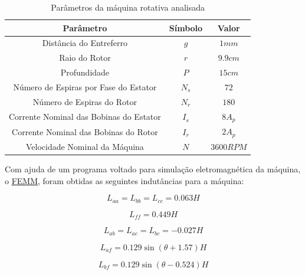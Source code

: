 \documentclass[a4paper]{article}
\theoremstyle{definition}
\theoremstyle{plain}
\begin{document}
\begin{table}[!htb]
\centering
\caption{Parâmetros da máquina rotativa analisada}
\label{Tab:par}
\begin{tabular}{ccc}
\hline
\textbf{Parâmetro}                      & \textbf{Símbolo} & \textbf{Valor} \\ \hline \hline
Distância do Entreferro                 & $g$              & $1mm$          \\
Raio do Rotor                           & $r$              & $9.9cm$        \\
Profundidade                            & $P$              & $15cm$         \\
Número de Espiras por Fase do Estator   & $N_s$            & $72$           \\
Número de Espiras do Rotor              & $N_r$            & $180$          \\
Corrente Nominal das Bobinas do Estator & $I_s$            & $8A_p$         \\
Corrente Nominal das Bobinas do Rotor   & $I_r$            & $2A_p$         \\
Velocidade Nominal da Máquina           & $N$              & $3600RPM$      \\ \hline
\end{tabular}
\end{table}

Com ajuda de um programa voltado para simulação eletromagnética da máquina, o  \href{https://www.femm.info/wiki/HomePage}{FEMM}, foram obtidas as seguintes indutâncias para a máquina: 

\begin{equation}
L_{aa} = L_{bb} = L_{cc} = 0.063 H  
\end{equation}


\begin{equation}
L_{ff} =  0.449 H 
\end{equation}


\begin{equation}
L_{ab} = L_{ac} = L_{bc} = -0.027 H
\end{equation}

\begin{equation}
L_{af} = 0.129 \sin(\theta + 1.57) H
\end{equation}

\begin{equation}
L_{bf} = 0.129 \sin(\theta -0.524) H
\end{equation}
\end{document}
